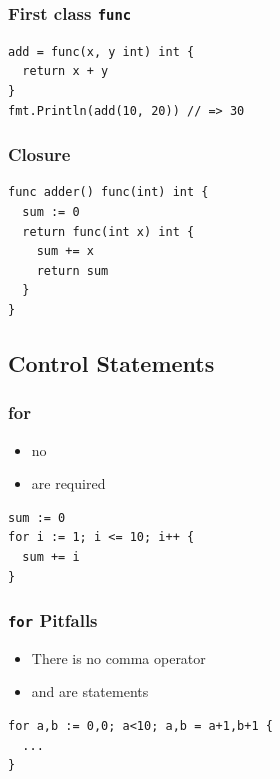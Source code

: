 \documentclass[xetex,mathserif,serif,12pt]{beamer}
\begin{document}
\begin{frame}[fragile]
  \frametitle{First class \texttt{func}}

  \begin{beamer@nomargin}
    \begin{lstlisting}
add = func(x, y int) int {
  return x + y
}
fmt.Println(add(10, 20)) // => 30
    \end{lstlisting}
  \end{beamer@nomargin}
\end{frame}

\begin{frame}[fragile]
  \frametitle{Closure}

  \begin{beamer@nomargin}
    \begin{lstlisting}
func adder() func(int) int {
  sum := 0
  return func(int x) int {
    sum += x
    return sum
  }
}
    \end{lstlisting}
  \end{beamer@nomargin}
\end{frame}

\subsection{Control Statements}

\begin{frame}[fragile]
  \frametitle{\ttfamily for}

  \begin{itemize}
  \item no \hltexttt{(} \hltexttt{)}
  \item \hltexttt{\}} \hltexttt{\}} are required
  \end{itemize}

  \begin{beamer@nomargin}
    \begin{lstlisting}
sum := 0
for i := 1; i <= 10; i++ {
  sum += i
}
    \end{lstlisting}
  \end{beamer@nomargin}
\end{frame}

\begin{frame}[fragile]
  \frametitle{\texttt{for} Pitfalls}

  \begin{itemize}
  \item There is no comma operator
  \item \hltexttt{++} and \hltexttt{--} are statements
  \end{itemize}

  \begin{beamer@nomargin}
    \begin{lstlisting}
for a,b := 0,0; a<10; a,b = a+1,b+1 {
  ...
}
    \end{lstlisting}
  \end{beamer@nomargin}
\end{frame}
\end{document}
